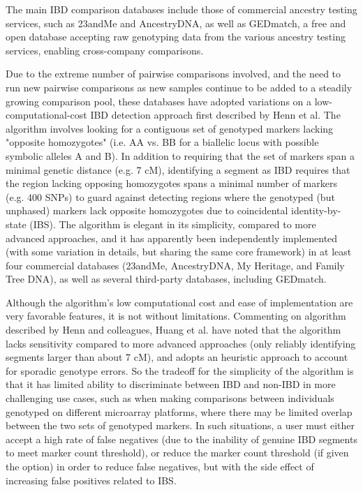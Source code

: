 \documentclass{article}
\begin{document}
The main IBD comparison databases include those of commercial ancestry testing services, such as 23andMe and AncestryDNA, as well as GEDmatch, a free and open database accepting raw genotyping data from the various ancestry testing services, enabling cross-company comparisons.\citep{GEDmatch}

Due to the extreme number of pairwise comparisons involved, and the need to run new pairwise comparisons as new samples continue to be added to a steadily growing comparison pool, these databases have adopted variations on a low-computational-cost IBD detection approach first described by Henn et al.\citep{23andMe} The algorithm involves looking for a contiguous set of genotyped markers lacking "opposite homozygotes" (i.e. AA vs. BB for a biallelic locus with possible symbolic alleles A and B). In addition to requiring that the set of markers span a minimal genetic distance (e.g. 7 cM), identifying a segment as IBD requires that the region lacking opposing homozygotes spans a minimal number of markers (e.g. 400 SNPs) to guard against detecting regions where the genotyped (but unphased) markers lack opposite homozygotes due to coincidental identity-by-state (IBS). The algorithm is elegant in its simplicity, compared to more advanced approaches, and it has apparently been independently implemented (with some variation in details, but sharing the same core framework) in at least four commercial databases (23andMe, AncestryDNA, My Heritage, and Family Tree DNA), as well as several third-party databases, including GEDmatch.

Although the algorithm's low computational cost and ease of implementation are very favorable features, it is not without limitations. Commenting on algorithm described by Henn and colleagues, Huang et al. have noted that the algorithm lacks sensitivity compared to more advanced approaches (only reliably identifying segments larger than about 7 cM), and adopts an heuristic approach to account for sporadic genotype errors.\citep{speeDB} So the tradeoff for the simplicity of the algorithm is that it has limited ability to discriminate between IBD and non-IBD in more challenging use cases, such as when making comparisons between individuals genotyped on different microarray platforms, where there may be limited overlap between the two sets of genotyped markers. In such situations, a user must either accept a high rate of false negatives (due to the inability of genuine IBD segments to meet marker count threshold), or reduce the marker count threshold (if given the option) in order to reduce false negatives, but with the side effect of increasing false positives related to IBS. 
\end{document}
